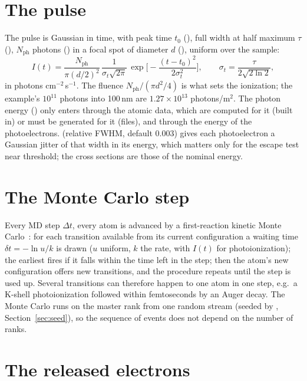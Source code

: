 \section{The pulse}

The pulse is Gaussian in time, with peak time $t_0$ (), full width at half maximum
$\tau$ (), $N_{\mathrm{ph}}$ photons () in a focal spot of
diameter $d$ (), uniform over the sample:
\begin{equation}
  I(t) = \frac{N_{\mathrm{ph}}}{\pi (d/2)^2}\,\frac{1}{\sigma_t\sqrt{2\pi}}\,
         \exp\!\Big[-\frac{(t-t_0)^2}{2\sigma_t^2}\Big],\qquad \sigma_t = \frac{\tau}{2\sqrt{2\ln 2}},
\end{equation}
in photons cm$^{-2}$\,s$^{-1}$.
The fluence $N_{\mathrm{ph}}/(\pi d^2/4)$ is what sets the ionization; the example's $10^{11}$ photons into 100\,nm
are $1.27\times10^{13}$ photons/\textmu m$^2$.
The photon energy () only enters through the atomic data, which are computed for it
(built in) or must be generated for it (files),
and through the energy of the photoelectrons.
 (relative FWHM, default 0.003) gives each photoelectron a Gaussian jitter of that width
in its energy, which matters only for the escape test near threshold; the cross sections are those of the nominal
energy.

\section{The Monte Carlo step}

Every MD step $\Delta t$, every atom is advanced by a first-reaction kinetic Monte Carlo~\cite{gillespie1976}:
for each transition available from its current configuration a waiting time $\delta t = -\ln u / k$ is drawn
($u$ uniform, $k$ the rate, with $I(t)$ for photoionization); the earliest fires if it falls within the time left in
the step; then the atom's new configuration offers new transitions, and the procedure repeats until the step is used
up.
Several transitions can therefore happen to one atom in one step, e.g.\ a K-shell photoionization followed within
femtoseconds by an Auger decay.
The Monte Carlo runs on the master rank from one random stream (seeded by ,
Section~\ref{sec:seed}), so the sequence of events does not depend on the number of ranks.

\section{The released electrons}

